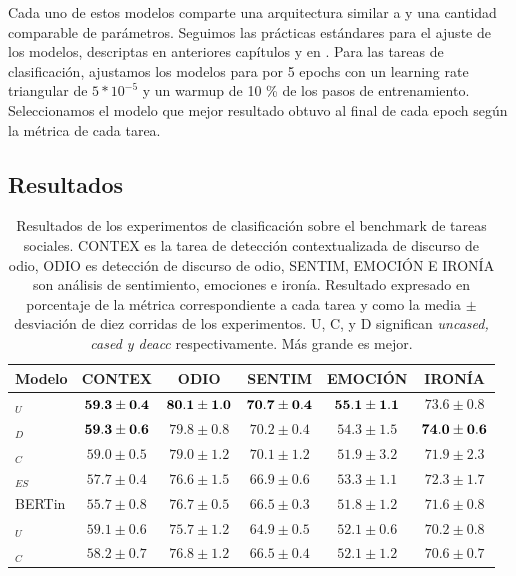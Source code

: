 Cada uno de estos modelos comparte una arquitectura similar a \robertuito{} y una cantidad comparable de parámetros. Seguimos las prácticas estándares para el ajuste de los modelos, descriptas en anteriores capítulos y en \citet{devlin2018bert}. Para las tareas de clasificación, ajustamos los modelos para por 5 epochs con un learning rate triangular de $5 * 10^{-5}$ y un warmup de 10 \% de los pasos de entrenamiento. Seleccionamos el modelo que mejor resultado obtuvo al final de cada epoch según la métrica de cada tarea.

\subsection{Resultados}


\begin{table}
    \centering
    \begin{tabular}{l ccccc }
        Modelo            & CONTEX               & ODIO                 & SENTIM               & EMOCIÓN              & IRONÍA               \\
        \hline
        \robertuito{}$_U$ & $\mathbf{59.3 \pm 0.4}$ & $\mathbf{80.1 \pm 1.0}$ & $\mathbf{70.7 \pm 0.4}$ & $\mathbf{55.1 \pm 1.1}$ & $73.6 \pm 0.8$       \\
        \robertuito{}$_D$ & $\mathbf{59.3 \pm 0.6}$ & $79.8 \pm 0.8$       & $70.2 \pm 0.4$       & $54.3 \pm 1.5$       & $\mathbf{74.0 \pm 0.6}$ \\
        \robertuito{}$_C$ & $59.0 \pm 0.5$       & $79.0 \pm 1.2$       & $70.1 \pm 1.2$       & $51.9 \pm 3.2$       & $71.9 \pm 2.3$       \\
        \roberta{}$_{ES}$ & $57.7 \pm 0.4$       & $76.6 \pm 1.5$       & $66.9 \pm 0.6$       & $53.3 \pm 1.1$       & $72.3 \pm 1.7$       \\
        BERTin            & $55.7 \pm 0.8$       & $76.7 \pm 0.5$       & $66.5 \pm 0.3$       & $51.8 \pm 1.2$       & $71.6 \pm 0.8$       \\
        \beto{}$_U$       & $59.1 \pm 0.6$       & $75.7 \pm 1.2$       & $64.9 \pm 0.5$       & $52.1 \pm 0.6$       & $70.2 \pm 0.8$       \\
        \beto{}$_C$       & $58.2 \pm 0.7$       & $76.8 \pm 1.2$       & $66.5 \pm 0.4$       & $52.1 \pm 1.2$       & $70.6 \pm 0.7$       \\
        \hline
    \end{tabular}
    \caption{Resultados de los experimentos de clasificación sobre el benchmark de tareas sociales. CONTEX es la tarea de detección contextualizada de discurso de odio, ODIO es detección de discurso de odio, SENTIM, EMOCIÓN E IRONÍA son análisis de sentimiento, emociones e ironía. Resultado expresado en porcentaje de la métrica correspondiente a cada tarea y como la media $\pm$ desviación de diez corridas de los experimentos. U, C, y D significan \emph{uncased, cased y deacc} respectivamente. Más grande es mejor.}
    \label{tab:robertuito_evaluation_results}
\end{table}


